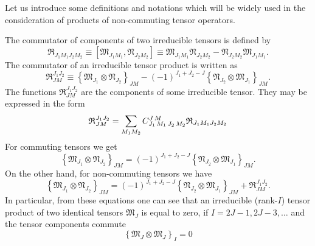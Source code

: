 Let us introduce some definitions and notations which will be widely used in the consideration of products of non-commuting tensor operators.

The commutator of components of two irreducible tensors is defined by
\begin{equation}
\mathfrak{R}_{J_{1} M_{1} J_{2} M_{2}} \equiv\left[\mathfrak{M}_{J_{1} M_{1}}, \mathfrak{N}_{J_{2} M_{2}}\right] \equiv \mathfrak{M}_{J_{1} M_{1}} \mathfrak{N}_{J_{2} M_{2}}-\mathfrak{N}_{J_{2} M_{2}} \mathfrak{M}_{J_{1} M_{1}} .\label{eq:3:1:24}
\end{equation}
The commutator of an irreducible tensor product is written as
\begin{equation}
\mathfrak{R}_{J M}^{J_{1} J_{2}} \equiv\left\{\mathfrak{M}_{J_{1}} \otimes \mathfrak{N}_{J_{2}}\right\}_{J M}-(-1)^{J_{1}+J_{2}-J}\left\{\mathfrak{N}_{J_{2}} \otimes \mathfrak{M}_{J_{1}}\right\}_{J M} . \label{eq:3:1:25}
\end{equation}
The functions $\mathfrak{R}_{J M}^{J_{1} J_{2}}$ are the components of some irreducible tensor. They may be expressed in the form
\begin{equation}
\mathfrak{R}_{J M}^{J_{1} J_{2}}=\sum_{M_{1} M_{2}} C_{J_{1}\,M_{1}\,J_{2}\,M_{2}}^{J\,M} \mathfrak{R}_{J_{1} M_{1} J_{2} M_{2}} \label{eq:3:1:26}
\end{equation}
For commuting tensors we get
\begin{equation}
\left\{\mathfrak{M}_{J_{1}} \otimes \mathfrak{N}_{J_{2}}\right\}_{J M}=(-1)^{J_{1}+J_{2}-J}\left\{\mathfrak{N}_{J_{2}} \otimes \mathfrak{M}_{J_{1}}\right\}_{J M} .\label{eq:3:1:27}
\end{equation}
On the other hand, for non-commuting tensors we have
\begin{equation}
\left\{\mathfrak{M}_{J_{1}} \otimes \mathfrak{N}_{J_{2}}\right\}_{J M}=(-1)^{J_{1}+J_{2}-J}\left\{\mathfrak{N}_{J_{2}} \otimes \mathfrak{M}_{J_{1}}\right\}_{J M}+\mathfrak{R}_{J M}^{J_{1} J_{2}} .\label{eq:3:1:28}
\end{equation}
In particular, from these equations one can see that an irreducible (rank-$I$) tensor product of two identical tensors $\mathfrak{M}_{J}$ is equal to zero, if $I=2 J-1,2 J-3, \ldots$ and the tensor components commute
\begin{equation}
\left\{\mathfrak{M}_{J} \otimes \mathfrak{M}_{J}\right\}_{I}=0 \label{eq:3:1:29}
\end{equation}
